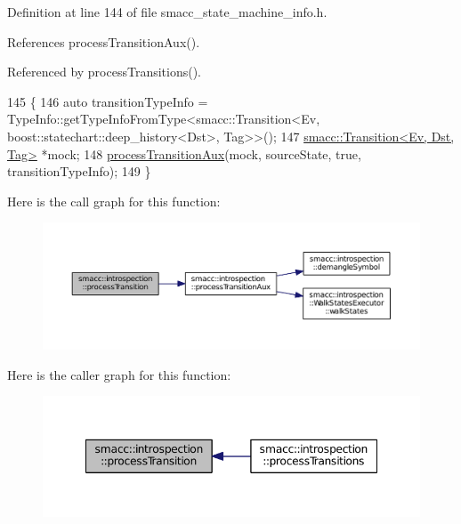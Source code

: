 Definition at line 144 of file smacc\+\_\+state\+\_\+machine\+\_\+info.\+h.



References process\+Transition\+Aux().



Referenced by process\+Transitions().


\begin{DoxyCode}
145 \{
146     \textcolor{keyword}{auto} transitionTypeInfo = TypeInfo::getTypeInfoFromType<smacc::Transition<Ev,
       boost::statechart::deep\_history<Dst>, Tag>>();
147     \hyperlink{classsmacc_1_1Transition}{smacc::Transition<Ev, Dst, Tag>} *mock;
148     \hyperlink{namespacesmacc_1_1introspection_a208cd71dc5579090d40b3d3b9efb28a6}{processTransitionAux}(mock, sourceState, \textcolor{keyword}{true}, transitionTypeInfo);
149 \}
\end{DoxyCode}


Here is the call graph for this function\+:
\nopagebreak
\begin{figure}[H]
\begin{center}
\leavevmode
\includegraphics[width=350pt]{namespacesmacc_1_1introspection_a91f7cda900e7002c923494db5afce63f_cgraph}
\end{center}
\end{figure}




Here is the caller graph for this function\+:
\nopagebreak
\begin{figure}[H]
\begin{center}
\leavevmode
\includegraphics[width=348pt]{namespacesmacc_1_1introspection_a91f7cda900e7002c923494db5afce63f_icgraph}
\end{center}
\end{figure}


